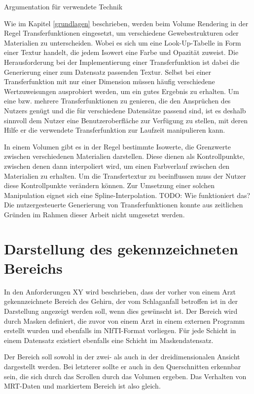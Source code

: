 Argumentation für verwendete Technik

Wie im Kapitel \ref{grundlagen} beschrieben, werden beim Volume Rendering in der Regel Transferfunktionen eingesetzt, um verschiedene Gewebestrukturen oder Materialien zu unterscheiden. Wobei es sich um eine Look-Up-Tabelle in Form einer Textur handelt, die jedem Isowert eine Farbe und Opazität zuweist.
Die Herausforderung bei der Implementierung einer Transferfunktion ist dabei die Generierung einer zum Datensatz passenden Textur. Selbst bei einer Transferfunktion mit nur einer Dimension müssen häufig verschiedene Wertzuweisungen ausprobiert werden, um ein gutes Ergebnis zu erhalten.
Um eine bzw. mehrere Transferfunktionen zu genieren, die den Ansprüchen des Nutzers genügt und die für verschiedene Datensätze passend sind, ist es deshalb sinnvoll dem Nutzer eine Benutzeroberfläche zur Verfügung zu stellen, mit deren Hilfe er die verwendete Transferfunktion zur Laufzeit manipulieren kann. 

In einem Volumen gibt es in der Regel bestimmte Isowerte, die Grenzwerte zwischen verschiedenen Materialien darstellen. Diese dienen als Kontrollpunkte, zwischen denen dann interpoliert wird, um einen Farbverlauf zwischen den Materialien zu erhalten. 
Um die Transfertextur zu beeinflussen muss der Nutzer diese Kontrollpunkte verändern können. Zur Umsetzung einer solchen Manipulation eignet sich eine Spline-Interpolation. 
TODO:
Wie funktioniert das?
Die nutzergesteuerte Generierung von Transferfunktionen konnte aus zeitlichen Gründen im Rahmen dieser Arbeit nicht umgesetzt werden.



\section{Darstellung des gekennzeichneten Bereichs}
\label{maske}

In den Anforderungen XY wird beschrieben, dass der vorher von einem Arzt gekennzeichnete Bereich des Gehirn, der vom Schlaganfall betroffen ist in der Darstellung angezeigt werden soll, wenn dies gewünscht ist. 
Der Bereich wird durch Masken definiert, die zuvor von einem Arzt in einem externen Programm erstellt wurden und ebenfalls im NIfTI-Format vorliegen. Für jede Schicht in einem Datensatz existiert ebenfalls eine Schicht im Maskendatensatz. 

Der Bereich soll sowohl in der zwei- als auch in der dreidimensionalen Ansicht dargestellt werden. Bei letzterer sollte er auch in den Querschnitten erkennbar sein, die sich durch das Scrollen durch das Volumen ergeben. Das Verhalten von MRT-Daten und markiertem Bereich ist also gleich.

